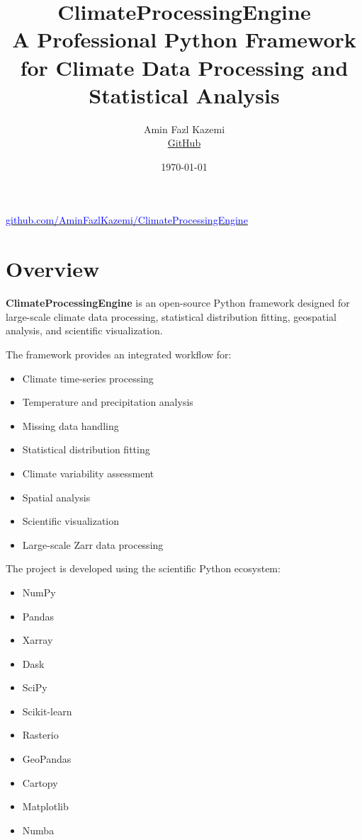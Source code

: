 \documentclass[11pt,a4paper]{article}
\title{
\textbf{ClimateProcessingEngine}\\
\large A Professional Python Framework for Climate Data Processing and Statistical Analysis
}
\author{
Amin Fazl Kazemi\\
\href{https://github.com/AminFazlKazemi}{GitHub}
}
\date{\today}
\begin{document}
\maketitle


\begin{center}

\href{https://github.com/AminFazlKazemi/ClimateProcessingEngine}{
\textcolor{blue}{
github.com/AminFazlKazemi/ClimateProcessingEngine
}
}

\end{center}


\section*{Overview}


\textbf{ClimateProcessingEngine} is an open-source Python framework designed for
large-scale climate data processing, statistical distribution fitting,
geospatial analysis, and scientific visualization.


The framework provides an integrated workflow for:

\begin{itemize}

\item Climate time-series processing
\item Temperature and precipitation analysis
\item Missing data handling
\item Statistical distribution fitting
\item Climate variability assessment
\item Spatial analysis
\item Scientific visualization
\item Large-scale Zarr data processing

\end{itemize}


The project is developed using the scientific Python ecosystem:

\begin{itemize}

\item NumPy
\item Pandas
\item Xarray
\item Dask
\item SciPy
\item Scikit-learn
\item Rasterio
\item GeoPandas
\item Cartopy
\item Matplotlib
\item Numba

\end{itemize}
\end{document}
